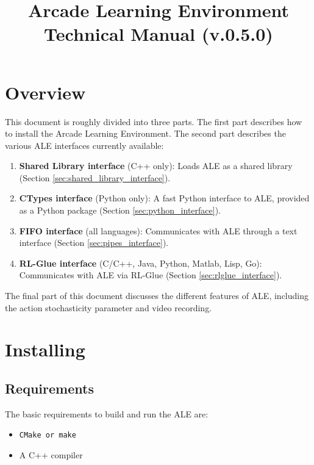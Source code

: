 \documentclass[12pt]{article}
\title{Arcade Learning Environment\\ Technical Manual (v.0.5.0)}
\author{}
\begin{document}
\maketitle

\clearpage

\tableofcontents

\clearpage

\section{Overview}

This document is roughly divided into three parts. The first part describes how to install the Arcade Learning Environment. The second part describes the various ALE interfaces currently available: 
\begin{enumerate}
  \item \textbf{Shared Library interface} (C++ only): Loads ALE as a shared library (Section 
  \ref{sec:shared_library_interface}).
  \item \textbf{CTypes interface} (Python only): A fast Python interface to ALE, provided as a Python package (Section \ref{sec:python_interface}).
  \item \textbf{FIFO interface} (all languages): Communicates with ALE through a text interface (Section \ref{sec:pipes_interface}).
  \item \textbf{RL-Glue interface} (C/C++, Java, Python, Matlab, Lisp, Go): Communicates with ALE via RL-Glue (Section \ref{sec:rlglue_interface}).
\end{enumerate}
The final part of this document discusses the different features of ALE, including the action stochasticity parameter and video recording.

\section{Installing}\label{sec:install}

\subsection{Requirements}

The basic requirements to build and run the ALE are:
\begin{itemize}
  \item \verb+CMake or make+
  \item A C++ compiler
\end{itemize}
\end{document}
